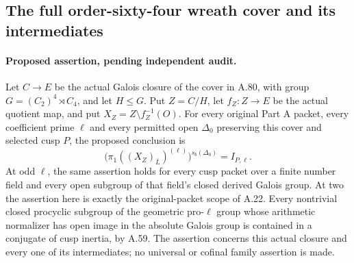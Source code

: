 \subsection{The full order-sixty-four wreath cover and its intermediates}

\paragraph{Proposed assertion, pending independent audit.}
Let \(C\to E\) be the actual Galois closure of the cover in A.80,
with group \(G=(C_2)^4\rtimes C_4\), and let \(H\le G\).
Put \(Z=C/H\), let \(f_Z:Z\to E\) be the actual quotient map,
and put \(X_Z=Z\setminus f_Z^{-1}(O)\).
For every original Part A packet, every coefficient prime \(\ell\)
and every permitted open \(\Delta_0\) preserving this cover and
selected cusp \(P\), the proposed conclusion is
\[
 \bigl(\pi_1((X_Z)_{\overline L})^{(\ell)}\bigr)^{s_b(\Delta_0)}
                           =I_{P,\ell}.                 \tag{FW.1}
\]
At odd \(\ell\), the same assertion holds for every cusp packet
over a finite number field and every open subgroup of that field's
closed derived Galois group. At two the assertion here is exactly
the original-packet scope of A.22. Every nontrivial closed procyclic
subgroup of the geometric pro-\(\ell\) group whose arithmetic
normalizer has open image in the absolute Galois group is contained
in a conjugate of cusp inertia, by A.59.
The assertion concerns this actual closure and every one of its
intermediates; no universal or cofinal family assertion is made.

